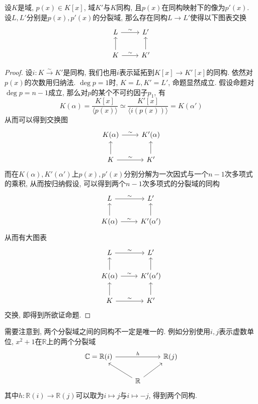 \begin{thm}[分裂域的同构唯一性]
    设$K$是域, $p(x)\in K[x]$, 域$K'$与$K$同构, 且$p(x)$在同构映射下的像为$p'(x)$.
    设$L,L'$分别是$p(x),p'(x)$的分裂域, 那么存在同构$L\to L'$使得以下图表交换
    \[\begin{tikzcd}
        L\ar[r, "\sim"] & L'\\
        K\ar[r, "\sim"] \ar[u] & K' \ar[u]
    \end{tikzcd}\]
\end{thm}
\begin{proof}
    设$i:K\xrightarrow{\sim}K'$是同构, 我们也用$i$表示延拓到$K[x]\to K'[x]$的同构.
    依然对$p(x)$的次数用归纳法.
    $\deg{p}=1$时, $K=L,K'=L'$, 命题显然成立.
    假设命题对$\deg{p}=n-1$成立, 那么对$p$的某个不可约因子$p_1$, 有
    \[K(\alpha)=\frac{K[x]}{\langle p(x)\rangle}\simeq\frac{K'[x]}{\langle i(p(x))\rangle}=K(\alpha')\]
    从而可以得到交换图
    \[\begin{tikzcd}
        K(\alpha)\ar[r,"\sim"] & K'(\alpha)\\
        K\ar[u]\ar[r,"\sim"] & K'\ar[u]
    \end{tikzcd}\]
    而在$K(\alpha),K'(\alpha')$上$p(x),p'(x)$分别分解为一次因式与一个$n-1$次多项式的乘积, 从而按归纳假设, 可以得到两个$n-1$次多项式的分裂域的同构
    \[\begin{tikzcd}
        L\ar[r, "\sim"] & L'\\
        K(\alpha)\ar[r, "\sim"] \ar[u] & K'(\alpha') \ar[u]
    \end{tikzcd}\]
    从而有大图表
    \[\begin{tikzcd}
        L\ar[r, "\sim"] & L'\\
        K(\alpha)\ar[r, "\sim"] \ar[u] & K'(\alpha') \ar[u]\\
        K\ar[r,"\sim"] \ar[u] & K'\ar[u]
    \end{tikzcd}\]
    交换, 即得到所欲证命题.
\end{proof}

\begin{rem}
    需要注意到, 两个分裂域之间的同构不一定是唯一的.
    例如分别使用$i,j$表示虚数单位, $x^2+1$在$\mathbb{R}$上的两个分裂域
    \[\begin{tikzcd}
        \mathbb{C}=\mathbb{R}(i)\ar[rr, "h"] & & \mathbb{R}(j)\\
        & \mathbb{R}\ar[ul] \ar[ur] &
    \end{tikzcd}\]
    其中$h:\mathbb{R}(i)\to\mathbb{R}(j)$可以取为$i\mapsto j$与$i\mapsto -j$, 得到两个同构.
\end{rem}